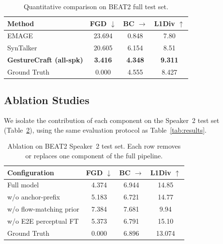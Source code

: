 
\begin{table}[t]
\scriptsize
\caption{Quantitative comparison on BEAT2 full test set.
  }
\label{tab:results_allspk}
\begin{tabular}{lccc}
\toprule
\textbf{Method} & \textbf{FGD $\downarrow$} & \textbf{BC $\rightarrow$} & \textbf{L1Div $\uparrow$} \\
\midrule
EMAGE~\cite{emage2024}                 & 23.694            & 0.848               & 7.80              \\
SynTalker~\cite{syntalker}             & 20.605            & 6.154               & 8.51              \\
\textbf{GestureCraft (all-spk)}                & \textbf{3.416} & \textbf{4.348} & \textbf{9.311} \\
\midrule
Ground Truth                           & 0.000             & 4.555               & 8.427             \\
\bottomrule
\end{tabular}
\end{table}

\subsection{Ablation Studies}
We isolate the contribution of each component on the Speaker~2 test set (Table~\ref{tab:ablation}), using the same evaluation protocol as Table~\ref{tab:results}.

\begin{table}[t]
\scriptsize
\caption{Ablation on BEAT2 Speaker~2 test set.%
  Each row removes or replaces one component of the full pipeline.}
\label{tab:ablation}
\begin{tabular}{lccc}
\toprule
\textbf{Configuration} & \textbf{FGD $\downarrow$} & \textbf{BC $\rightarrow$} & \textbf{L1Div $\uparrow$} \\
\midrule
Full model            & 4.374 & 6.944 & 14.85 \\
w/o anchor-prefix              & 5.183          & 6.721 & 14.77 \\
w/o flow-matching prior        & 7.384          & 7.681 & 9.94 \\
w/o E2E perceptual FT          & 5.373          & 6.791 & 15.10 \\
\midrule
Ground Truth                   & 0.000          & 6.896 & 13.074 \\
\bottomrule
\end{tabular}
\end{table}

